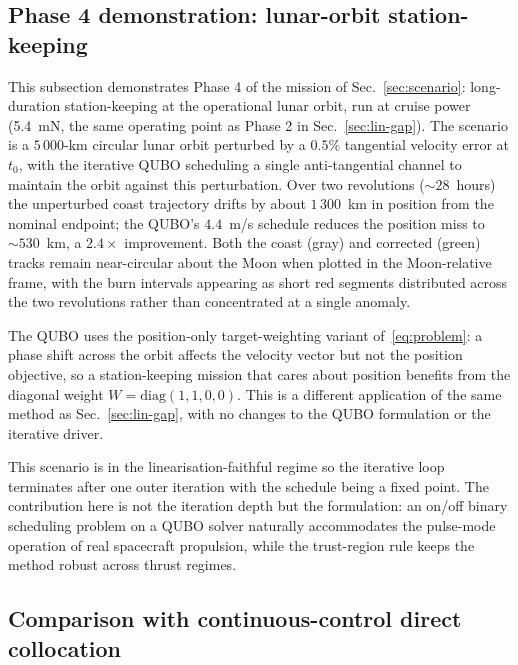 \documentclass[11pt,a4paper]{article}
\theoremstyle{plain}
\begin{document}
\subsection{Phase 4 demonstration: lunar-orbit
  station-keeping}\label{sec:moon-orbit}

This subsection demonstrates Phase 4 of the mission of
Sec.~\ref{sec:scenario}: long-duration station-keeping at the
operational lunar orbit, run at cruise power
(\SI{5.4}{\milli\newton}, the same operating point as Phase 2
in Sec.~\ref{sec:lin-gap}). The scenario is a $5\,000$-km
circular lunar orbit perturbed by a $0.5\%$ tangential velocity
error at $t_0$, with the iterative QUBO scheduling a single
anti-tangential channel to maintain the orbit against this
perturbation. Over two revolutions ($\sim 28$~hours) the
unperturbed coast trajectory drifts by about $1\,300$~km in
position from the nominal endpoint; the QUBO's $4.4$~m/s
schedule reduces the position miss to $\sim 530$~km, a
$2.4\times$ improvement. Both the coast (gray) and corrected
(green) tracks remain near-circular about the Moon when plotted
in the Moon-relative frame, with the burn intervals appearing
as short red segments distributed across the two revolutions
rather than concentrated at a single anomaly.

The QUBO uses the position-only target-weighting variant
of~\eqref{eq:problem}: a phase shift across the orbit affects the
velocity vector but not the position objective, so a
station-keeping mission that cares about position benefits from the diagonal weight $W = \mathrm{diag}(1,1,0,0)$.
This is a different application of the same method as
Sec.~\ref{sec:lin-gap}, with no changes to the QUBO formulation
or the iterative driver.

This scenario is in the linearisation-faithful regime so the iterative loop
terminates after one outer iteration with the schedule being a
fixed point. The contribution here is not the iteration depth
but the formulation: an on/off binary scheduling problem on a
QUBO solver naturally accommodates the pulse-mode operation of
real spacecraft propulsion, while the trust-region rule keeps
the method robust across thrust regimes.

\subsection{Comparison with continuous-control direct
collocation}\label{sec:nlp}
\end{document}
